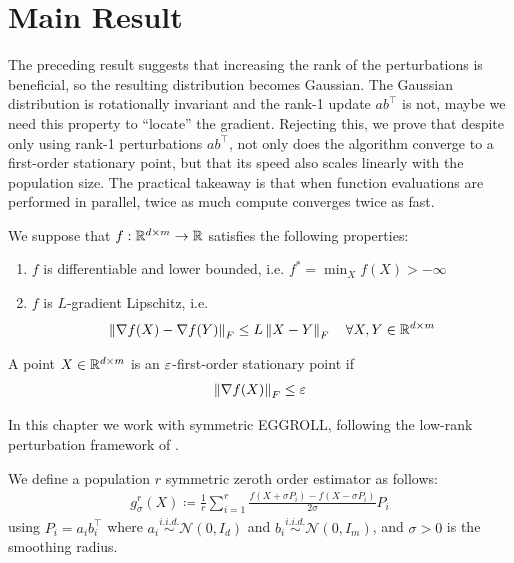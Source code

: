 \section{Main Result}
The preceding result suggests that increasing the rank of the perturbations is beneficial, so the resulting distribution becomes Gaussian. The Gaussian distribution is rotationally invariant and the rank-1 update $ab^\top$ is not, maybe we need this property to ``locate'' the gradient. Rejecting this, we prove that despite only using rank-1 perturbations $ab^\top$, not only does the algorithm converge to a first-order stationary point, but that its speed also scales linearly with the population size. The practical takeaway is that when function evaluations are performed in parallel, twice as much compute converges twice as fast. 

\begin{assumption}[Properties of $f$]
    We suppose that $f: \mathbb{R}^{d \times m} \to \mathbb{R}$ satisfies the following properties:
        \begin{enumerate}
            \item $f$ is differentiable and lower bounded, i.e. $f^* = \min_X f(X) > -\infty$
            \item $f$ is $L$-gradient Lipschitz, i.e.
            \begin{align*}
                \left\lVert \nabla f(X) - \nabla f(Y) \right\rVert_F \leq L \left\lVert X-Y \right\rVert_F \quad \forall X,Y \in \mathbb{R}^{d \times m}
            \end{align*}
        \end{enumerate} 
\end{assumption}

\begin{definition}
    A point $X \in \mathbb{R}^{d \times m}$ is an $\varepsilon$-first-order stationary point if 
    \begin{align*}
        \left\lVert \nabla f(X) \right\rVert_F \leq \varepsilon
    \end{align*}
\end{definition}

In this chapter we work with symmetric EGGROLL, following the low-rank perturbation framework of \citet{sarkar2025evolution}.
\begin{definition}
    \label{def:symm-eggroll-update}
    We define a population $r$ symmetric zeroth order estimator as follows:
    \begin{align*}
        g_\sigma^{r}(X) \coloneqq \frac 1r \sum_{i=1}^r \frac{f(X + \sigma P_{i}) - f(X - \sigma P_{i})}{2\sigma} P_{i}
    \end{align*}
    using $P_{i} = a_{i}b_{i}^\top$ where $a_i \overset{i.i.d.}{\sim} \mathcal N(0, I_d)$ and $b_i \overset{i.i.d.}{\sim} \mathcal N(0, I_m)$, and $\sigma > 0$ is the smoothing radius.
\end{definition}

